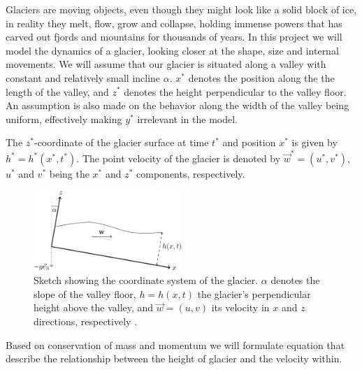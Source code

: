 Glaciers are moving objects, even though they might look like a solid block of ice, in reality they melt, flow, grow and collapse, holding immense powers that has carved out fjords and mountains for thousands of years.
In this project we will model the dynamics of a glacier, looking closer at the shape, size and internal movements.
We will assume that our glacier is situated along a valley with constant and relatively small incline $\alpha$. $x^*$ denotes the position along the the length of the valley, and $z^*$ denotes the height perpendicular to the valley floor. An assumption is also made on the behavior along the width of the valley being uniform, effectively making $y^*$ irrelevant in the model.

The $z^*$-coordinate of the glacier surface at time $t^*$ and position $x^*$ is given by $h^* = h^*(x^*, t^*)$. The point velocity of the glacier is denoted by $\vec{w}^* = (u^*, v^*)$, $u^*$ and $v^*$ being the $x^*$ and $z^*$ components, respectively.

\begin{figure}
  \centering
    \includegraphics[width=0.5\textwidth]{images/coordinate_system.png}
  \caption{Sketch showing the coordinate system of the glacier. $\alpha$ denotes the slope of the valley floor, $h = h(x, t)$ the glacier's perpendicular height above the valley, and $\vec{w} = (u, v)$ its velocity in $x$ and $z$ directions, respectively \cite{project-description}.}
  \label{fig:coordinate_system}
\end{figure}

Based on conservation of mass and momentum we will formulate equation that describe the relationship between the height of glacier and the velocity within. 